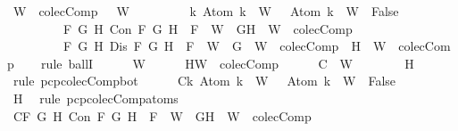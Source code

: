 \begin{isabellebody}
\ {\isachardoublequoteopen}{\isasymforall}W\ {\isasymin}\ colecComp{\isachardot}\ {\isasymbottom}\ {\isasymnotin}\ W\isanewline
\ \ \ \ \ \ \ \ {\isasymand}\ {\isacharparenleft}{\isasymforall}k{\isachardot}\ Atom\ k\ {\isasymin}\ W\ {\isasymlongrightarrow}\ \isactrlbold {\isasymnot}\ {\isacharparenleft}Atom\ k{\isacharparenright}\ {\isasymin}\ W\ {\isasymlongrightarrow}\ False{\isacharparenright}\isanewline
\ \ \ \ \ \ \ \ {\isasymand}\ {\isacharparenleft}{\isasymforall}F\ G\ H{\isachardot}\ Con\ F\ G\ H\ {\isasymlongrightarrow}\ F\ {\isasymin}\ W\ {\isasymlongrightarrow}\ {\isacharbraceleft}G{\isacharcomma}H{\isacharbraceright}\ {\isasymunion}\ W\ {\isasymin}\ colecComp{\isacharparenright}\isanewline
\ \ \ \ \ \ \ \ {\isasymand}\ {\isacharparenleft}{\isasymforall}F\ G\ H{\isachardot}\ Dis\ F\ G\ H\ {\isasymlongrightarrow}\ F\ {\isasymin}\ W\ {\isasymlongrightarrow}\ {\isacharbraceleft}G{\isacharbraceright}\ {\isasymunion}\ W\ {\isasymin}\ colecComp\ {\isasymor}\ {\isacharbraceleft}H{\isacharbraceright}\ {\isasymunion}\ W\ {\isasymin}\ colecComp{\isacharparenright}{\isachardoublequoteclose}\isanewline
\ \ \isamarkupfalse%
\ {\isacharparenleft}rule\ ballI{\isacharparenright}\isanewline
\ \ \ \ \isamarkupfalse%
\ W\isanewline
\ \ \ \ \isamarkupfalse%
\ H{\isacharcolon}{\isachardoublequoteopen}W\ {\isasymin}\ colecComp{\isachardoublequoteclose}\isanewline
\ \ \ \ \isamarkupfalse%
\ C{}{\isacharcolon}{\isachardoublequoteopen}{\isasymbottom}\ {\isasymnotin}\ W{\isachardoublequoteclose}\isanewline
\ \ \ \ \ \ \isamarkupfalse%
\ H\ \isamarkupfalse%
\ {\isacharparenleft}rule\ pcp{\isacharunderscore}colecComp{\isacharunderscore}bot{\isacharparenright}\isanewline
\ \ \ \ \isamarkupfalse%
\ C{}{\isacharcolon}{\isachardoublequoteopen}{\isasymforall}k{\isachardot}\ Atom\ k\ {\isasymin}\ W\ {\isasymlongrightarrow}\ \isactrlbold {\isasymnot}\ {\isacharparenleft}Atom\ k{\isacharparenright}\ {\isasymin}\ W\ {\isasymlongrightarrow}\ False{\isachardoublequoteclose}\isanewline
\ \ \ \ \ \ \isamarkupfalse%
\ H\ \isamarkupfalse%
\ {\isacharparenleft}rule\ pcp{\isacharunderscore}colecComp{\isacharunderscore}atoms{\isacharparenright}\isanewline
\ \ \ \ \isamarkupfalse%
\ C{}{\isacharcolon}{\isachardoublequoteopen}{\isasymforall}F\ G\ H{\isachardot}\ Con\ F\ G\ H\ {\isasymlongrightarrow}\ F\ {\isasymin}\ W\ {\isasymlongrightarrow}\ {\isacharbraceleft}G{\isacharcomma}H{\isacharbraceright}\ {\isasymunion}\ W\ {\isasymin}\ colecComp{\isachardoublequoteclose}\isanewline

\end{isabellebody}
